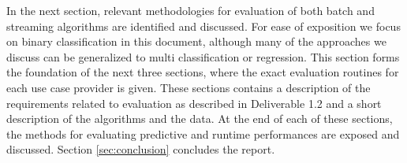 In the next section, relevant methodologies for evaluation of both batch and streaming algorithms are identified and discussed.  
For ease of exposition we  focus on binary classification in this document, although many of the approaches we discuss can be generalized to multi classification or regression.  
This section forms the foundation of the next three sections, where the exact evaluation routines for each use case provider is given. 
These sections contains a description of the requirements related to evaluation as described in Deliverable 1.2 and a short description of the algorithms and the data.  
At the end of each of these sections, the methods for evaluating predictive and runtime performances are exposed and discussed.  
Section \ref{sec:conclusion} concludes the report.

%



%
%

